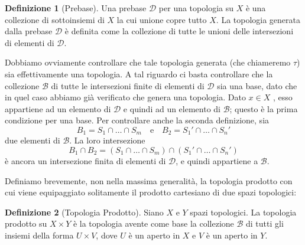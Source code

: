 \documentclass[10pt,a4paper]{article}
\theoremstyle{definition}
\newtheorem{defi}{Definizione}
\theoremstyle{plain}
\theoremstyle{remark}
\newtheorem{rem}{Remark}
\theoremstyle{remark}
\newcommand{\B}{\mathcal{B}}
\newcommand{\D}{\mathcal{D}}
\begin{document}


\begin{defi}[Prebase] Una prebase $\D$ per una topologia su $X$ è una collezione di sottoinsiemi di $X$ la cui unione copre tutto $X$. La topologia generata dalla prebase $\D$ è definita come la collezione di tutte le unioni delle intersezioni di elementi di $\D$.
\end{defi}
Dobbiamo ovviamente controllare che tale topologia generata (che chiameremo $\tau$) sia effettivamente una topologia. A tal riguardo ci basta controllare che la collezione $\B$ di tutte le intersezioni finite di elementi di $\D$ sia una base, dato che in quel caso abbiamo già verificato che genera una topologia. Dato $x \in X$ , esso appartiene ad un elemento di $\D$ e quindi ad un elemento di $\B$; questo è la prima condizione per una base. Per controllare anche la seconda definizione, sia \[ B_1=S_1 \cap \dots \cap S_m \ \ \ \text{ e } \ \ \ B_2=S_1' \cap \dots \cap S_n' \] due elementi di $\B$. La loro intersezione \[B_1 \cap B_2 = \left( S_1 \cap \dots \cap S_m \right) \cap \left( S_1' \cap \dots \cap S_n' \right) \] è ancora un intersezione finita di elementi di $\D$, e quindi appartiene a $\B$.


Definiamo brevemente, non nella massima generalità, la topologia prodotto con cui viene equipaggiato solitamente il prodotto cartesiano di due spazi topologici:
\begin{defi}[Topologia Prodotto] Siano $X$ e $Y$ spazi topologici. La topologia prodotto su $X \times Y$ è la topologia avente come base la collezione $\B$ di tutti gli insiemi della forma $U \times V$, dove $U$ è un aperto in $X$ e $V$ è un aperto in $Y$.
\end{defi}
\end{document}
